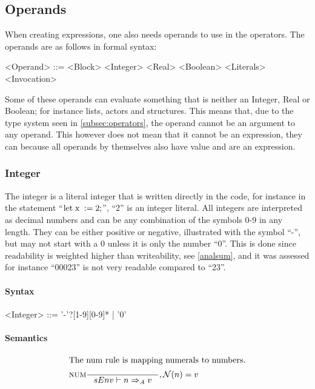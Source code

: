 \subsection{Operands}\label{operands}

When creating expressions, one also needs operands to use in the operators. The operands are as follows in formal syntax:
\begin{grammar}
<Operand>	::= <Block>
 \alt <Integer>
 \alt <Real>
 \alt <Boolean>
 \alt <Literals>
 \alt <Invocation>
\end{grammar}
Some of these operands can evaluate something that is neither an Integer, Real or Boolean; for instance lists, actors and structures. This means that, due to the type system seen in \cref{subsec:operators}, the operand cannot be an argument to any operand. This however does not mean that it cannot be an expression, they can because all operands by themselves also have value and are an expression.

\subsubsection{Integer}
The integer is a literal integer that is written directly in the code, for instance in the statement \enquote{$\text{let} \mathbin{\; \text{x} \;} := 2;$}, \enquote{2} is an integer literal. All integers are interpreted as decimal numbers and can be any combination of the symbols 0-9 in any length. They can be either positive or negative, illustrated with the symbol \enquote{-}, but may not start with a 0 unless it is only the number \enquote{0}. This is done since readability is weighted higher than writeability, see \cref{analsum}, and it was assessed for instance \enquote{00023} is not very readable compared to \enquote{23}. 

\paragraph{Syntax}

\begin{grammar}
<Integer> ::= '-'?[1-9][0-9]* | '0'
\end{grammar}

\paragraph{Semantics}


\begin{align*}
\intertext{The num rule is mapping numerals to numbers.}
&\inference[NUM]{}
                  {sEnv \vdash n \Rightarrow_A v}
                  {, \mathcal{N}(n) = v}
\end{align*}

